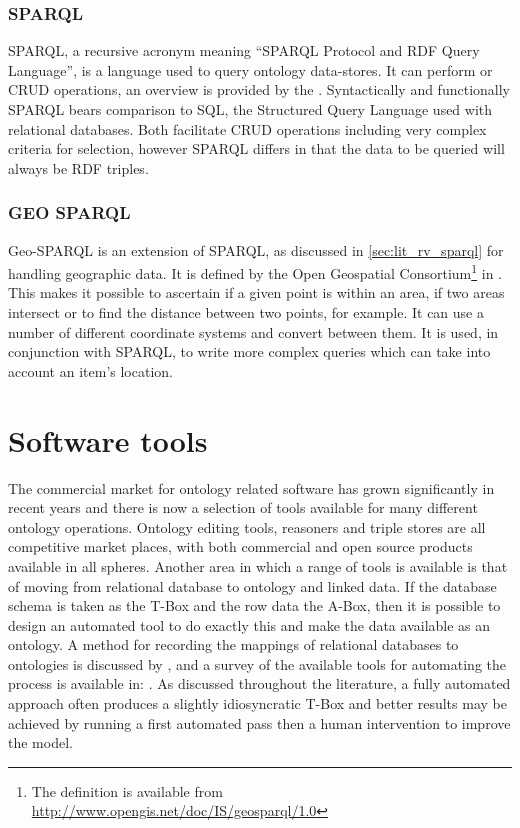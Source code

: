 \subsubsection{SPARQL}
\label{sec:lit_rv_sparql}
SPARQL, a recursive acronym meaning ``SPARQL Protocol and RDF Query Language'', is a language used to query ontology data-stores. It can perform   or CRUD operations, an overview is provided by the \citet{5403219}. Syntactically and functionally SPARQL bears comparison to SQL, the Structured Query Language used with relational databases. Both facilitate CRUD operations including very complex criteria for selection, however SPARQL differs in that the data to be queried will always be RDF triples. 

\subsubsection{GEO SPARQL}
Geo-SPARQL is an extension of SPARQL, as discussed in \autoref{sec:lit_rv_sparql} for handling geographic data. It is defined by the Open Geospatial Consortium\footnote{The definition is available from \url{http://www.opengis.net/doc/IS/geosparql/1.0}} in \citet{Perry2012}. This makes it possible to ascertain if a given point is within an area, if two areas intersect or to find the distance between two points, for example. It can use a number of different coordinate systems and convert between them. It is used, in conjunction with SPARQL, to write more complex queries which can take into account an item's location.

\section{Software tools}
The commercial market for ontology related software has grown significantly in recent years and there is now a selection of tools available for many different ontology operations. Ontology editing tools, reasoners and triple stores are all competitive market places, with both commercial and open source products available in all spheres. Another area in which a range of tools is available is that of moving from relational database to ontology and linked data. If the database schema is taken as the T-Box and the row data the A-Box, then it is possible to design an automated tool to do exactly this and make the data available as an ontology. A method for recording the mappings of relational databases to ontologies is discussed by \citet{Dimou2014}, and a survey of the available tools for automating the process is available in: \citep{Spanos2012}. As discussed throughout the literature, a fully automated approach often produces a slightly idiosyncratic T-Box and better results may be achieved by running a first automated pass then a human intervention to improve the model.

